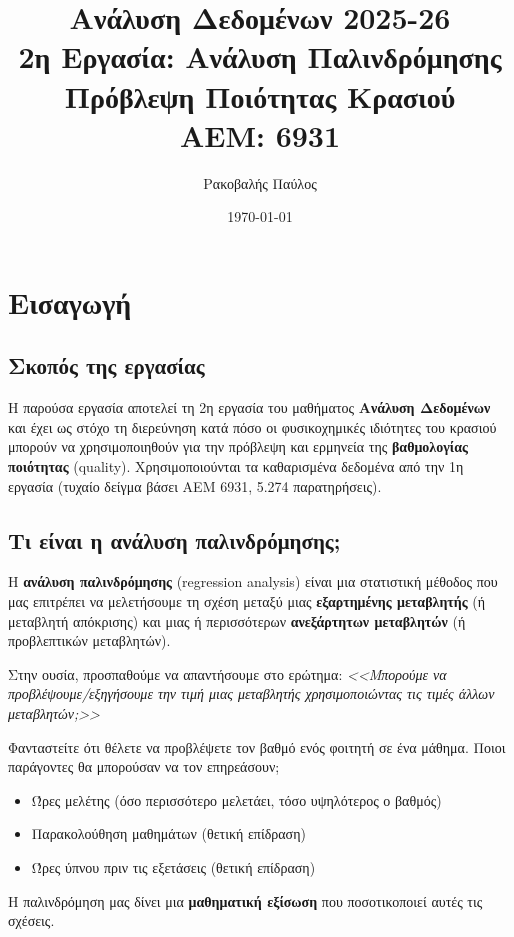 \documentclass[12pt,a4paper]{article}
\title{
    \textbf{Ανάλυση Δεδομένων 2025-26}\\[0.3cm]
    \Large 2η Εργασία: Ανάλυση Παλινδρόμησης\\[0.2cm]
    \large Πρόβλεψη Ποιότητας Κρασιού\\[0.5cm]
    \normalsize AEM: 6931
}
\author{Ρακοβαλής Παύλος}
\date{\today}
\begin{document}
\maketitle
\thispagestyle{fancy}

\tableofcontents
\newpage

\section{Εισαγωγή}

\subsection{Σκοπός της εργασίας}

Η παρούσα εργασία αποτελεί τη 2η εργασία του μαθήματος \textbf{Ανάλυση Δεδομένων} και έχει ως στόχο τη διερεύνηση κατά πόσο οι φυσικοχημικές ιδιότητες του κρασιού μπορούν να χρησιμοποιηθούν για την πρόβλεψη και ερμηνεία της \textbf{βαθμολογίας ποιότητας} (quality). Χρησιμοποιούνται τα καθαρισμένα δεδομένα από την 1η εργασία (τυχαίο δείγμα βάσει ΑΕΜ 6931, 5.274 παρατηρήσεις).

\subsection{Τι είναι η ανάλυση παλινδρόμησης;}

\begin{theorybox}
Η \textbf{ανάλυση παλινδρόμησης} (regression analysis) είναι μια στατιστική μέθοδος που μας επιτρέπει να μελετήσουμε τη σχέση μεταξύ μιας \textbf{εξαρτημένης μεταβλητής} (ή μεταβλητή απόκρισης) και μιας ή περισσότερων \textbf{ανεξάρτητων μεταβλητών} (ή προβλεπτικών μεταβλητών).

Στην ουσία, προσπαθούμε να απαντήσουμε στο ερώτημα: \textit{<<Μπορούμε να προβλέψουμε/εξηγήσουμε την τιμή μιας μεταβλητής χρησιμοποιώντας τις τιμές άλλων μεταβλητών;>>}
\end{theorybox}

\begin{examplebox}
Φανταστείτε ότι θέλετε να προβλέψετε τον βαθμό ενός φοιτητή σε ένα μάθημα. Ποιοι παράγοντες θα μπορούσαν να τον επηρεάσουν;
\begin{itemize}
    \item Ώρες μελέτης (όσο περισσότερο μελετάει, τόσο υψηλότερος ο βαθμός)
    \item Παρακολούθηση μαθημάτων (θετική επίδραση)
    \item Ώρες ύπνου πριν τις εξετάσεις (θετική επίδραση)
\end{itemize}
Η παλινδρόμηση μας δίνει μια \textbf{μαθηματική εξίσωση} που ποσοτικοποιεί αυτές τις σχέσεις.
\end{examplebox}
\end{document}
